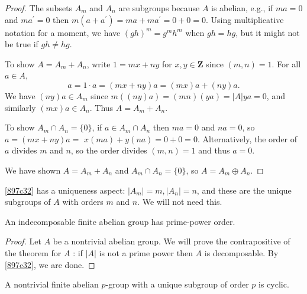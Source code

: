 \begin{proof}
The subsets $A_m$ and $A_n$ are subgroups because $A$ is abelian, e.g., if $m a=0$ and $m a^{\prime}=0$ then $m\left(a+a^{\prime}\right)=m a+m a^{\prime}=0+0=0$. Using multiplicative notation for a moment, we have $(g h)^m=g^m h^m$ when $g h=h g$, but it might not be true if $g h \neq h g$.

To show $A=A_m+A_n$, write $1=m x+n y$ for $x, y \in \mathbf{Z}$ since $(m, n)=1$. For all $a \in A$,
\[
a=1 \cdot a=(m x+n y) a=(m x) a+(n y) a .
\]
We have $(n y) a \in A_m$ since $m((n y) a)=(m n)(y a)=|A| y a=0$, and similarly $(m x) a \in A_n$. Thus $A=A_m+A_n$.

To show $A_m \cap A_n=\{0\}$, if $a \in A_m \cap A_n$ then $m a=0$ and $n a=0$, so $a=(m x+n y) a=$ $x(m a)+y(n a)=0+0=0$. Alternatively, the order of $a$ divides $m$ and $n$, so the order divides $(m, n)=1$ and thus $a=0$.

We have shown $A=A_m+A_n$ and $A_m \cap A_n=\{0\}$, so $A=A_m \oplus A_n$.
\end{proof}

\begin{remark}
\cref{897c32}  has a uniqueness aspect: $\left|A_m\right|=m,\left|A_n\right|=n$, and these are the unique subgroups of $A$ with orders $m$ and $n$. We will not need this.
\end{remark}
\begin{theorem}
An indecomposable finite abelian group has prime-power order.
\end{theorem}
\begin{proof}
Let $A$ be a nontrivial abelian group. We will prove the contrapositive of the theorem for $A$ : if $|A|$ is not a prime power then $A$ is decomposable. By \cref{897c32}, we are done.
\end{proof}

\begin{lemma}[3.4]
A nontrivial finite abelian $p$-group with a unique subgroup of order $p$ is cyclic.\label{4f15a0}
\end{lemma}

